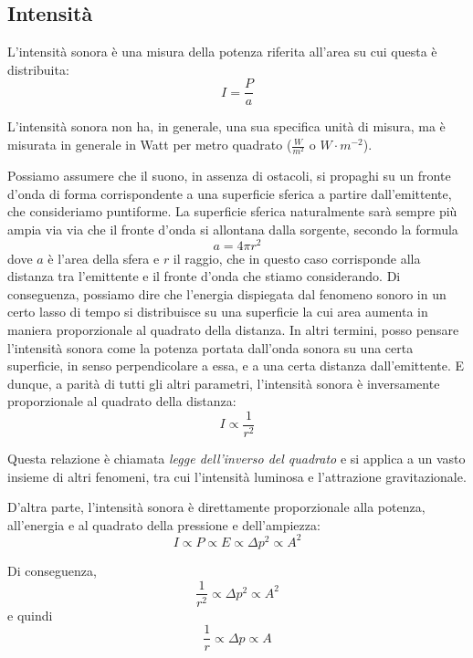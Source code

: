\documentclass[11pt]{report}
\begin{document}
\subsection{Intensità}

L'intensità sonora è una misura della potenza riferita all'area su cui questa è distribuita:
\begin{equation}
I = \frac{P}{a}
\end{equation}

L'intensità sonora non ha, in generale, una sua specifica unità di misura, ma è misurata in generale in Watt per metro quadrato ($\frac{W}{m^2}$ o $W \cdot m^{-2}$).

Possiamo assumere che il suono, in assenza di ostacoli, si propaghi su un fronte d'onda di forma corrispondente a una superficie sferica a partire dall'emittente, che consideriamo puntiforme. La superficie sferica naturalmente sarà sempre più ampia via via che il fronte d'onda si allontana dalla sorgente, secondo la formula
\begin{equation}
a = 4 \pi r^2
\end{equation}
dove $a$ è l'area della sfera e $r$ il raggio, che in questo caso corrisponde alla distanza tra l'emittente e il fronte d'onda che stiamo considerando. Di conseguenza, possiamo dire che l'energia dispiegata dal fenomeno sonoro in un certo lasso di tempo si distribuisce su una superficie la cui area aumenta in maniera proporzionale al quadrato della distanza. In altri termini, posso pensare l'intensità sonora come la potenza portata dall'onda sonora su una certa superficie, in senso perpendicolare a essa, e a una certa distanza dall'emittente. E dunque, a parità di tutti gli altri parametri, l'intensità sonora è inversamente proporzionale al quadrato della distanza:
\begin{equation}
I \propto \frac{1}{r^2}
\end{equation}

Questa relazione è chiamata \emph{legge dell'inverso del quadrato} e si applica a un vasto insieme di altri fenomeni, tra cui l'intensità luminosa e l'attrazione gravitazionale.

D'altra parte, l'intensità sonora è direttamente proporzionale alla potenza, all'energia e al quadrato della pressione e dell'ampiezza:
\begin{equation}
I \propto P \propto E \propto \Delta p^2 \propto A^2
\end{equation}

Di conseguenza,
\begin{equation}
\frac{1}{r^2} \propto \Delta p^2 \propto A^2
\end{equation}
e quindi
\begin{equation}
\frac{1}{r} \propto \Delta p \propto A
\end{equation}
\end{document}
